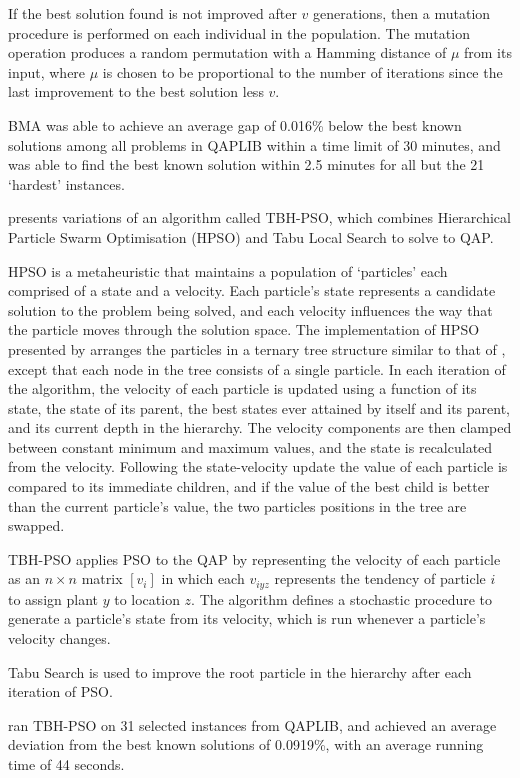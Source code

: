 {	If the best solution found is not improved after \(v\) generations, then a mutation procedure is performed on each individual in the population. The mutation operation produces a random permutation with a Hamming distance of \(\mu\) from its input, where \(\mu\) is chosen to be proportional to the number of iterations since the last improvement to the best solution less \(v\).

	BMA was able to achieve an average gap of 0.016\% below the best known solutions among all problems in QAPLIB within a time limit of 30 minutes, and was able to find the best known solution within 2.5 minutes for all but the 21 `hardest' instances.



	\citet{Helal:2015de} presents variations of an algorithm called TBH-PSO, which combines Hierarchical Particle Swarm Optimisation (HPSO) and Tabu Local Search to solve to QAP.

	HPSO is a metaheuristic that maintains a population of `particles' each comprised of a state and a velocity. Each particle's state represents a candidate solution to the problem being solved, and each velocity influences the way that the particle moves through the solution space.
	The implementation of HPSO presented by \citeauthor{Helal:2015de} arranges the particles in a ternary tree structure similar to that of \citet{Harris:2015kw}, except that each node in the tree consists of a single particle.
	In each iteration of the algorithm, the velocity of each particle is updated using a function of its state, the state of its parent, the best states ever attained by itself and its parent, and its current depth in the hierarchy.
	The velocity components are then clamped between constant minimum and maximum values, and the state is recalculated from the velocity.
	Following the state-velocity update the value of each particle is compared to its immediate children, and if the value of the best child is better than the current particle's value, the two particles positions in the tree are swapped.

	TBH-PSO applies PSO to the QAP by representing the velocity of each particle as an \(n \times n\) matrix \([v_{i}]\) in which each \(v_{iyz}\) represents the tendency of particle \(i\) to assign plant \(y\) to location \(z\).
	The algorithm defines a stochastic procedure to generate a particle's state from its velocity, which is run whenever a particle's velocity changes.

	Tabu Search is used to improve the root particle in the hierarchy after each iteration of PSO.

	\citeauthor{Helal:2015de} ran TBH-PSO on 31 selected instances from QAPLIB, and achieved an average deviation from the best known solutions of 0.0919\%, with an average running time of 44 seconds.
}
